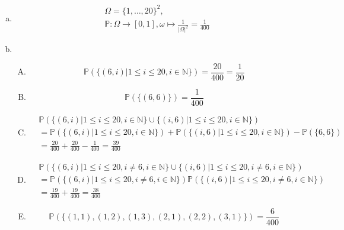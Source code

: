 \documentclass{article}
\newcommand{\N}{\mathbb{N}}
\renewcommand{\P}{\mathbb{P}}
\begin{document}
    \subsection{}
    \begin{enumerate}[a)]
        \item
            \begin{align*}
                \Omega = \{1,\hdots,20\}^2,\\
                \P: \Omega\rightarrow [0,1],
                \omega\mapsto
                \frac{1}{|\Omega|^2}=\frac{1}{400}
            \end{align*}
        \item
            \begin{enumerate}[A)]
                \item
                    \begin{equation*}
                        \P(\{(6,i)|1\leq i\leq 20, i\in\N\})
                        =\frac{20}{400}=\frac{1}{20}
                    \end{equation*}
                \item
                    \begin{equation*}
                        \P(\{(6,6)\})
                        =\frac{1}{400}
                    \end{equation*}
                \item
                    \begin{align*}
                        &\P(
                            \{(6,i)|1\leq i\leq 20, i\in\N\}\cup
                            \{(i,6)|1\leq i\leq 20, i\in\N\}
                        )\\
                        &=
                        \P(\{(6,i)|1\leq i\leq 20, i\in\N\})+
                        \P(\{(i,6)|1\leq i\leq 20, i\in\N\})-
                        \P(\{6,6\})\\
                        &=\frac{20}{400}+\frac{20}{400}-\frac{1}{400}
                        =\frac{39}{400}
                    \end{align*}
                \item
                    \begin{align*}
                        &\P(
                            \{(6,i)|1\leq i\leq 20, i\neq 6, i\in\N\}\cup
                            \{(i,6)|1\leq i\leq 20, i\neq 6, i\in\N\}
                        )\\
                        &=
                        \P(\{(6,i)|1\leq i\leq 20, i\neq 6, i\in\N\})
                        \P(\{(i,6)|1\leq i\leq 20, i\neq 6, i\in\N\})\\
                        &=\frac{19}{400}+\frac{19}{400}=\frac{38}{400}
                    \end{align*}
                \item
                    \begin{equation*}
                        \P(\{(1,1),(1,2),(1,3),(2,1),(2,2),(3,1)\})
                        =\frac{6}{400}
                    \end{equation*}
            \end{enumerate}
    \end{enumerate}
\end{document}
